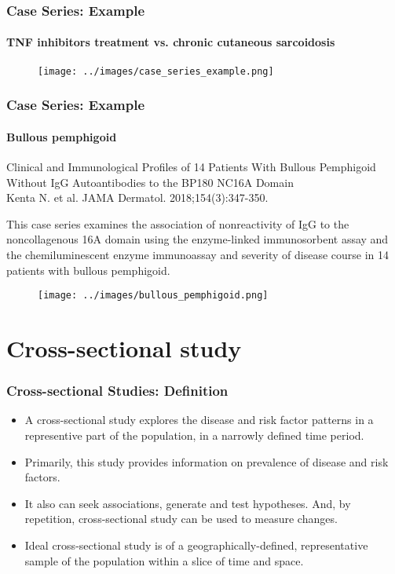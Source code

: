 \documentclass[table,10pt]{beamer}
\begin{document}
\begin{CJK*}{UTF8}{gbsn}
\begin{frame}[t]
\frametitle{Case Series: Example}
\framesubtitle{TNF inhibitors treatment vs. chronic cutaneous sarcoidosis}
\begin{figure}
\texttt{[image: ../images/case\_series\_example.png]}
\end{figure}
\end{frame}

\begin{frame}[t]
\frametitle{Case Series: Example}
\framesubtitle{Bullous pemphigoid}
{\large \alert{Clinical and Immunological Profiles of 14 Patients With Bullous
Pemphigoid Without IgG Autoantibodies to the BP180 NC16A Domain}}\\
\small{Kenta N. et al. JAMA Dermatol. 2018;154(3):347-350.}

This case series examines the association of nonreactivity of IgG to the 
noncollagenous 16A domain using the enzyme-linked immunosorbent assay and 
the chemiluminescent enzyme immunoassay and severity of disease course in 
14 patients with bullous pemphigoid.

\begin{figure}
\texttt{[image: ../images/bullous\_pemphigoid.png]}
\end{figure}
\end{frame}

\section{Cross-sectional study}

\begin{frame}[t]
\frametitle{Cross-sectional Studies: Definition}
\begin{itemize}
	\item A cross-sectional study explores the disease and risk factor 
		patterns in a representive part of the population, in a 
		narrowly defined time period.
	\item Primarily, this study provides information on \alert{prevalence} 
		of disease and risk factors.
	\item It also can seek associations, generate and test hypotheses. And, 
		by repetition, cross-sectional study can be used to measure 
		changes.
	\item Ideal cross-sectional study is of a geographically-defined, 
		representative sample of the population within a slice of 
		time and space.    
\end{itemize}
\end{frame}


\end{CJK*}
\end{document}
